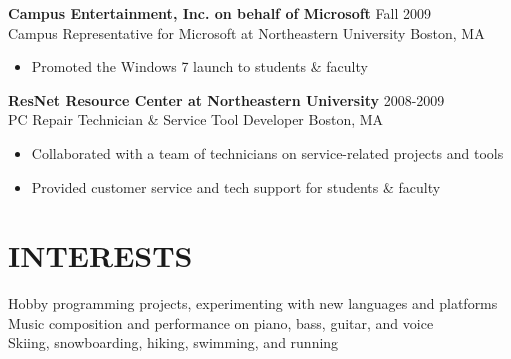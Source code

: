 \documentclass[line,margin]{res}
\begin{document}
\begin{resume}
    {\large \textbf{Campus Entertainment, Inc. on behalf of Microsoft}}
    \hfill Fall 2009 \\
    Campus Representative for Microsoft at Northeastern University
    \hfill Boston, MA
    \begin{itemize}  \itemsep -2pt
        \item Promoted the Windows 7 launch to students \& faculty
    \end{itemize}

    {\large \textbf{ResNet Resource Center at Northeastern University}}
    \hfill 2008-2009 \\
    PC Repair Technician \& Service Tool Developer
    \hfill Boston, MA
    \begin{itemize}  \itemsep -2pt %
        \item Collaborated with a team of technicians on service-related projects and tools
        \item Provided customer service and tech support for students \& faculty
    \end{itemize}

\section{INTERESTS}
    Hobby programming projects, experimenting with new languages and platforms \\
    Music composition and performance on piano, bass, guitar, and voice \\
    Skiing, snowboarding, hiking, swimming, and running

\end{resume}
\end{document}
